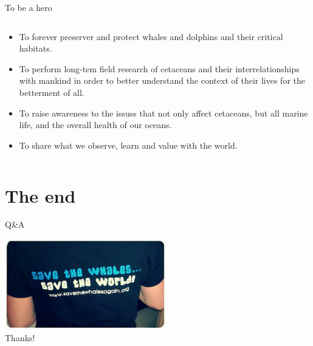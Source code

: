 \documentclass[hyperref={unicode}]{beamer}
\begin{document}
\begin{CJK}{UTF8}{gkai}
\begin{frame}{To be a hero}
\begin{columns}
\begin{column}{0.5\textwidth}
  \begin{itemize}
  \item To forever preserver and protect whales and dolphins and their critical habitats.
    \pause
  \item To perform long-tem field research of cetaceans and their interrelationships with mankind in order to better understand the context of their lives for the betterment of all.
    \pause
\item To raise awareness to the issuss that not only affect cetaceans, but all marine life, and the overall health of our oceans.
  \pause
\item To share what we observe, learn and value with the world.
\end{itemize}
\end{column}
\end{columns}
\end{frame}

\section{The end}
\begin{frame}{Q\&A}
  \begin{center}
    \includegraphics[width=7cm]{website} \\
    \LARGE{\alert{Thanks!}}
  \end{center}
\end{frame}
\end{CJK}
\end{document}
